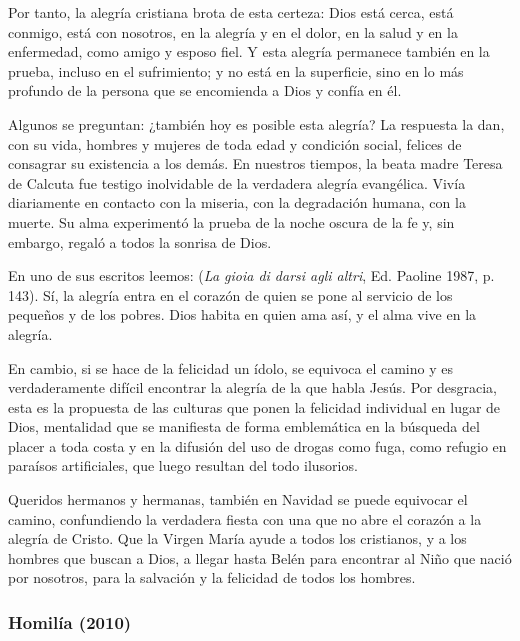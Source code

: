 Por tanto, la alegría cristiana brota de esta certeza: Dios está cerca, está conmigo, está con nosotros, en la alegría y en el dolor, en la salud y en la enfermedad, como amigo y esposo fiel. Y esta alegría permanece también en la prueba, incluso en el sufrimiento; y no está en la superficie, sino en lo más profundo de la persona que se encomienda a Dios y confía en él.

Algunos se preguntan: ¿también hoy es posible esta alegría? La respuesta la dan, con su vida, hombres y mujeres de toda edad y condición social, felices de consagrar su existencia a los demás. En nuestros tiempos, la beata madre Teresa de Calcuta fue testigo inolvidable de la verdadera alegría evangélica. Vivía diariamente en contacto con la miseria, con la degradación humana, con la muerte. Su alma experimentó la prueba de la noche oscura de la fe y, sin embargo, regaló a todos la sonrisa de Dios.

En uno de sus escritos leemos:  (\emph{La gioia di darsi agli altri}, Ed. Paoline 1987, p. 143). Sí, la alegría entra en el corazón de quien se pone al servicio de los pequeños y de los pobres. Dios habita en quien ama así, y el alma vive en la alegría.

En cambio, si se hace de la felicidad un ídolo, se equivoca el camino y es verdaderamente difícil encontrar la alegría de la que habla Jesús. Por desgracia, esta es la propuesta de las culturas que ponen la felicidad individual en lugar de Dios, mentalidad que se manifiesta de forma emblemática en la búsqueda del placer a toda costa y en la difusión del uso de drogas como fuga, como refugio en paraísos artificiales, que luego resultan del todo ilusorios.

Queridos hermanos y hermanas, también en Navidad se puede equivocar el camino, confundiendo la verdadera fiesta con una que no abre el corazón a la alegría de Cristo. Que la Virgen María ayude a todos los cristianos, y a los hombres que buscan a Dios, a llegar hasta Belén para encontrar al Niño que nació por nosotros, para la salvación y la felicidad de todos los hombres.


\subsubsection{Homilía (2010)}

